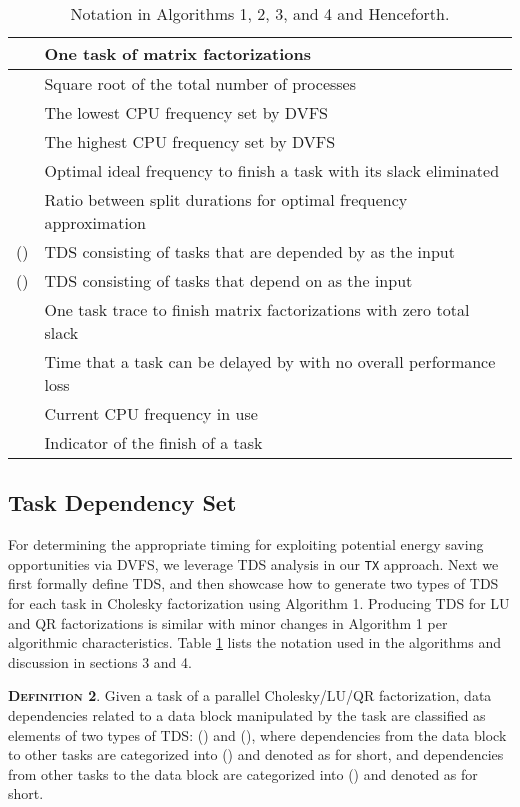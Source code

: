 \documentclass[12pt]{elsarticle}
\begin{document}
\begin{table}\small \centering
\caption{Notation in Algorithms 1, 2, 3, and 4 and Henceforth.}
\label{notation1}
\begin{tabular}{|c|l|}
\hline
 & One task of matrix factorizations\\\hline
 & Square root of the total number of processes\\
\hline
 & The lowest CPU frequency set by DVFS\\
\hline
 & The highest CPU frequency set by DVFS\\
\hline
 & Optimal ideal frequency to finish a task with its slack eliminated\\\hline
 & Ratio between split durations for optimal frequency approximation\\
\hline
\textsf{()} & TDS consisting of tasks that are depended by  as the input\\ \hline
\textsf{()} & TDS consisting of tasks that depend on  as the input\\ \hline
 & One task trace to finish matrix factorizations with zero total slack\\\hline
 & Time that a task can be delayed by with no overall performance loss\\
\hline
 & Current CPU frequency in use\\
\hline
 & Indicator of the finish of a task\\
\hline
\end{tabular}
\normalsize
\end{table}

\subsection{Task Dependency Set}

For determining the appropriate timing for exploiting potential energy saving opportunities via DVFS, we leverage TDS analysis in our \texttt{TX} approach. Next we first formally define TDS, and then showcase how to generate two types of TDS for each task in Cholesky factorization using Algorithm 1. Producing TDS for LU and QR factorizations is similar with minor changes in Algorithm 1 per algorithmic characteristics. Table \ref{notation1} lists the notation used in the algorithms and discussion in sections 3 and 4.

\vspace{1mm}
\noindent\textsc{\textbf{Definition 2}}. Given a task  of a parallel Cholesky/LU/QR factorization, data dependencies related to a data block manipulated by the task  are classified as elements of two types of TDS: \textsf{()} and \textsf{()}, where dependencies from the data block to other tasks  are categorized into \textsf{()} and denoted as  for short, and dependencies from other tasks  to the data block are categorized into \textsf{()} and denoted as  for short.
\end{document}
